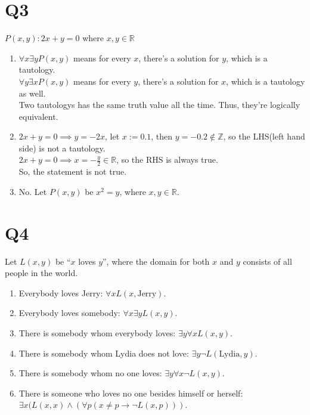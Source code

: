 \documentclass[11pt]{article}
\newenvironment{qparts}{\begin{enumerate}[{(}a{)}]}{\end{enumerate}}
\begin{document}
\section*{Q3}
$P(x,y): 2x+y=0$ where $x,y \in \mathbb{R}$
\begin{qparts}
    \item $\forall x \exists yP(x,y)$ means for every $x$, 
    there's a solution for $y$, which is a tautology. \\
    $\forall y \exists xP(x,y)$ means for every $y$, 
    there's a solution for $x$, which is a tautology as well.\\
    Two tautologys has the same truth value all the time. Thus,
    they're logically equivalent.
    
    \item 
    $2x+y=0 \implies y=-2x$, let $x:=0.1$, then $y=-0.2 \notin \mathbb{Z}$, 
    so the LHS(left hand side) is not a tautology.\\
    $2x+y=0 \implies x=-\frac{y}{2}\in \mathbb{R}$, so the RHS is always true.
    \\
    So, the statement is not true.
    
    
    
    \item No. Let $P(x,y)$ be $x^{2}=y$, where $x,y \in \mathbb{R}$.
\end{qparts}


\section*{Q4}
Let $L(x,y)$ be ``$x$ loves $y$'', where the domain for
both $x$ and $y$ consists of all people in the world.

\begin{qparts}
    \item Everybody loves Jerry: 
    $\forall x L(x,\text{Jerry})$.

    \item Everybody loves somebody: 
    $\forall x \exists yL(x,y)$.

    \item There is somebody whom everybody loves: 
    $\exists y \forall x L(x,y)$.
    
    \item There is somebody whom Lydia does not love:
    $\exists y \lnot L(\text{Lydia},y)$.
    
    \item There is somebody whom no one loves:
    $\exists y \forall x \lnot L(x,y)$.
    
    \item There is someone who loves no one besides himself or herself:
    $\exists x (L(x,x)\land (\forall p (x\neq p\to \lnot L(x,p)))$.
\end{qparts}
\end{document}
